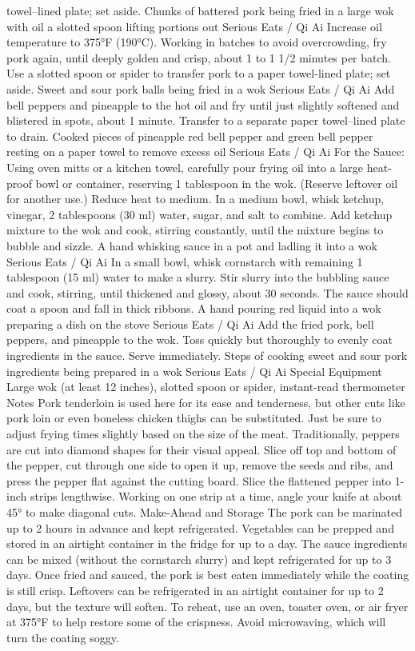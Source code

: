 towel–lined plate; set aside. Chunks of battered pork being fried in a large wok with oil a slotted spoon lifting portions out Serious Eats / Qi Ai Increase oil temperature to 375°F (190°C). Working in batches to avoid overcrowding, fry pork again, until deeply golden and crisp, about 1 to 1 1/2 minutes per batch. Use a slotted spoon or spider to transfer pork to a paper towel-lined plate; set aside. Sweet and sour pork balls being fried in a wok Serious Eats / Qi Ai Add bell peppers and pineapple to the hot oil and fry until just slightly softened and blistered in spots, about 1 minute. Transfer to a separate paper towel–lined plate to drain. Cooked pieces of pineapple red bell pepper and green bell pepper resting on a paper towel to remove excess oil Serious Eats / Qi Ai For the Sauce: Using oven mitts or a kitchen towel, carefully pour frying oil into a large heat-proof bowl or container, reserving 1 tablespoon in the wok. (Reserve leftover oil for another use.) Reduce heat to medium. In a medium bowl, whisk ketchup, vinegar, 2 tablespoons (30 ml) water, sugar, and salt to combine. Add ketchup mixture to the wok and cook, stirring constantly, until the mixture begins to bubble and sizzle. A hand whisking sauce in a pot and ladling it into a wok Serious Eats / Qi Ai In a small bowl, whisk cornstarch with remaining 1 tablespoon (15 ml) water to make a slurry. Stir slurry into the bubbling sauce and cook, stirring, until thickened and glossy, about 30 seconds. The sauce should coat a spoon and fall in thick ribbons. A hand pouring red liquid into a wok preparing a dish on the stove Serious Eats / Qi Ai Add the fried pork, bell peppers, and pineapple to the wok. Toss quickly but thoroughly to evenly coat ingredients in the sauce. Serve immediately. Steps of cooking sweet and sour pork ingredients being prepared in a wok Serious Eats / Qi Ai Special Equipment Large wok (at least 12 inches), slotted spoon or spider, instant-read thermometer Notes Pork tenderloin is used here for its ease and tenderness, but other cuts like pork loin or even boneless chicken thighs can be substituted. Just be sure to adjust frying times slightly based on the size of the meat. Traditionally, peppers are cut into diamond shapes for their visual appeal. Slice off top and bottom of the pepper, cut through one side to open it up, remove the seeds and ribs, and press the pepper flat against the cutting board. Slice the flattened pepper into 1-inch strips lengthwise. Working on one strip at a time, angle your knife at about 45° to make diagonal cuts. Make-Ahead and Storage The pork can be marinated up to 2 hours in advance and kept refrigerated. Vegetables can be prepped and stored in an airtight container in the fridge for up to a day. The sauce ingredients can be mixed (without the cornstarch slurry) and kept refrigerated for up to 3 days. Once fried and sauced, the pork is best eaten immediately while the coating is still crisp. Leftovers can be refrigerated in an airtight container for up to 2 days, but the texture will soften. To reheat, use an oven, toaster oven, or air fryer at 375°F to help restore some of the crispness. Avoid microwaving, which will turn the coating soggy.
\par

